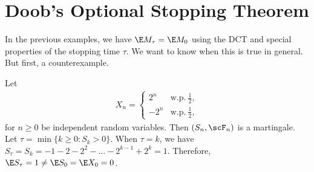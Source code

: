 \documentclass[../aipt.tex]{subfiles}
\begin{document}
\section{Doob's Optional Stopping Theorem}

In the previous examples, we have $\E M_\tau = \E M_0$ using the DCT and special properties of the stopping time $\tau$. We want to know when this is true in general. But first, a counterexample.  

\begin{Example}[Counterexample]\label{wk13:ex:counter}
Let
\begin{align*}
X_n = 
\begin{cases} 
2^n & \text{w.p.}\  \frac{1}{2}, \\ 
-2^n & \text{w.p.}\ \frac{1}{2},
\end{cases} 
\end{align*}
for $n \geq 0$ be independent random variables. Then $(S_n, \scF_n)$ is a martingale. Let $\tau = \min \{k \geq 0: S_k > 0\}$. When $\tau = k$, we have $S_\tau = S_k = -1 - 2 - 2^2 - \ldots -2^{k-1} + 2^k = 1$. Therefore, $\E S_\tau = 1 \neq \E S_0 = \E X_0 = 0$. 
\end{Example}
\end{document}
